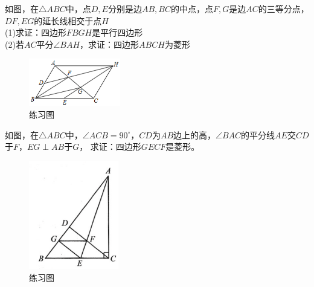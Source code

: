 \documentclass{ecnuthesis}
\begin{document}
\begin{problem}
    如图，在$\triangle ABC$中，点$D,E$分别是边$AB,BC$的中点，点$F,G$是边$AC$的三等分点，$DF,EG$的延长线相交于点$H$ \\
    (1)求证：四边形$FBGH$是平行四边形 \\
    (2)若$AC$平分$\angle BAH$，求证：四边形$ABCH$为菱形 \\
\end{problem}
\begin{figure}[H]
\centering
\includegraphics[width=4cm]{picture/678.png}
\caption{练习图}
\end{figure}
\begin{problem}
    如图，在$\triangle ABC$中，$\angle ACB=90^\circ$，$CD$为$AB$边上的高，$\angle BAC$的平分线$AE$交$CD$于$F$，$EG\perp AB$于$G$，
    求证：四边形$GECF$是菱形。
\end{problem}
\begin{figure}[H]
\centering
\includegraphics[width=4cm]{picture/679.png}
\caption{练习图}
\end{figure}
\clearpage
\end{document}
